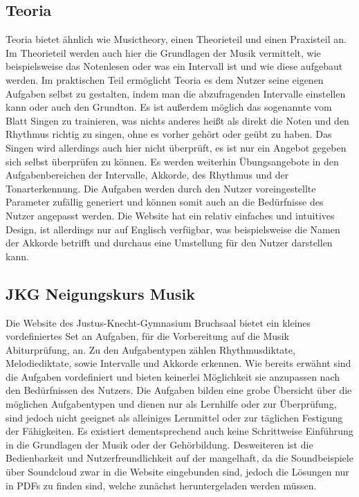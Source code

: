 \subsection*{Teoria}
\label{sec:Teoria}
Teoria bietet ähnlich wie Musictheory, einen Theorieteil und einen Praxisteil an. Im Theorieteil werden auch hier die Grundlagen der Musik vermittelt, wie beispielsweise das Notenlesen oder was ein Intervall ist und wie diese aufgebaut werden.
Im praktischen Teil ermöglicht Teoria es dem Nutzer seine eigenen Aufgaben selbst zu gestalten, indem man die abzufragenden Intervalle einstellen kann oder auch den Grundton. Es ist außerdem möglich das sogenannte vom Blatt Singen zu trainieren, was nichts anderes
heißt als direkt die Noten und den Rhythmus richtig zu singen, ohne es vorher gehört oder geübt zu haben. Das Singen wird allerdings auch hier nicht überprüft, es ist nur ein Angebot gegeben sich selbst überprüfen zu können. Es werden weiterhin Übungsangebote in den
Aufgabenbereichen der Intervalle, Akkorde, des Rhythmus und der Tonarterkennung. Die Aufgaben werden durch den Nutzer voreingestellte Parameter zufällig generiert und können somit auch an die Bedürfnisse des Nutzer angepasst werden. 
Die Website hat ein relativ einfaches und intuitives Design, ist allerdings nur auf Englisch verfügbar, was beispielsweise die Namen der Akkorde betrifft und durchaus eine Umstellung für den Nutzer darstellen kann. \cite{teoria}

\subsection*{JKG Neigungskurs Musik}
\label{sec:Neigungskurs}
Die Website des Justus-Knecht-Gymnasium Bruchsaal bietet ein kleines vordefiniertes Set an Aufgaben, für die Vorbereitung auf die Musik Abiturprüfung, an. Zu den Aufgabentypen zählen Rhythmusdiktate, Melodiediktate, sowie Intervalle und Akkorde erkennen.
Wie bereits erwähnt sind die Aufgaben vordefiniert und bieten keinerlei Möglichkeit sie anzupassen nach den Bedürfnissen des Nutzers. Die Aufgaben bilden eine grobe Übersicht über die möglichen Aufgabentypen und dienen nur als Lernhilfe oder zur Überprüfung, sind jedoch 
nicht geeignet als alleiniges Lernmittel oder zur täglichen Festigung der Fähigkeiten. Es existiert dementsprechend auch keine Schrittweise Einführung in die Grundlagen der Musik oder der Gehörbildung. Desweiteren ist die Bedienbarkeit und Nutzerfreundlichkeit auf der mangelhaft, da die Soundbeispiele über Soundcloud zwar in die Website eingebunden sind, jedoch die Lösungen nur in 
PDFs zu finden sind, welche zunächst heruntergeladen werden müssen. \cite{jkg_bruch}

